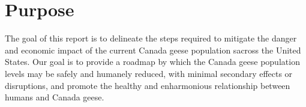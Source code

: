 \section{Purpose}
The goal of this report is to delineate the steps required  to  mitigate  the  danger  and  economic impact  of  the  current  Canada  geese  population sacross the United States. Our goal is to provide a roadmap by which the Canada geese population levels may be safely and humanely reduced, with minimal secondary effects or disruptions, and promote  the  healthy  and  enharmonious  relationship between humans and Canada geese.
